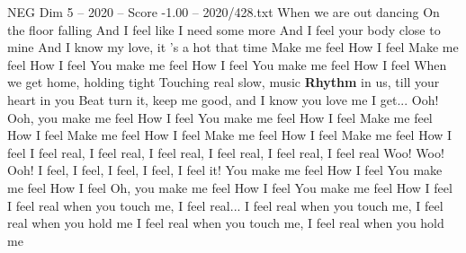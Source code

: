 \begin{textsample}{NEG Dim 5 – 2020 – Score -1.00 – 2020/428.txt}  \label{ex:f5_neg_027}
When we are out dancing On the floor falling And I feel like I need some more And I feel your body close to mine And I know my love, it 's a hot that time Make me feel How I feel Make me feel How I feel You make me feel How I feel You make me feel How I feel When we get home, holding tight Touching real slow, music \textbf{Rhythm} in us, till your heart in you Beat turn it, keep me good, and I know you love me I get...
Ooh!
Ooh, you make me feel How I feel You make me feel How I feel Make me feel How I feel Make me feel How I feel Make me feel How I feel Make me feel How I feel I feel real, I feel real, I feel real, I feel real, I feel real, I feel real Woo!
Woo!
Ooh!
I feel, I feel, I feel, I feel, I feel it!
You make me feel How I feel You make me feel How I feel Oh, you make me feel How I feel You make me feel How I feel I feel real when you touch me, I feel real...
I feel real when you touch me, I feel real when you hold me I feel real when you touch me, I feel real when you hold me

\end{textsample}
